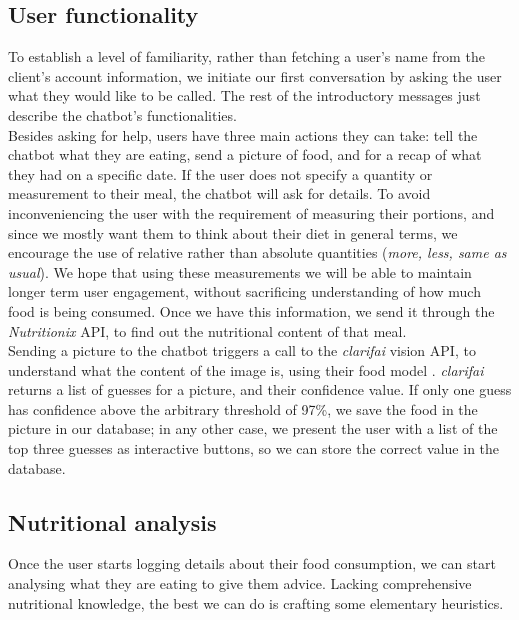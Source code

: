 \subsection{User functionality}
To establish a level of familiarity, rather than fetching a user's name from the client's account information, we initiate our first conversation by asking the user what they would like to be called. The rest of the introductory messages just describe the chatbot's functionalities.\\
Besides asking for help, users have three main actions they can take: tell the chatbot what they are eating, send a picture of food, and for a recap of what they had on a specific date. If the user does not specify a quantity or measurement to their meal, the chatbot will ask for details. To avoid inconveniencing the user with the requirement of measuring their portions, and since we mostly want them to think about their diet in general terms, we encourage the use of relative rather than absolute quantities (\textit{more, less, same as usual}). We hope that using these measurements we will be able to maintain longer term user engagement, without sacrificing understanding of how much food is being consumed. Once we have this information, we send it through the \textit{Nutritionix} API, to find out the nutritional content of that meal. \\
Sending a picture to the chatbot triggers a call to the \textit{clarifai} vision API, to understand what the content of the image is, using their food model \cite{clarifaifood}. \textit{clarifai} returns a list of guesses for a picture, and their confidence value. If only one guess has confidence above the arbitrary threshold of 97\%, we save the food in the picture in our database; in any other case, we present the user with a list of the top three guesses as interactive buttons, so we can store the correct value in the database. 
\subsection{Nutritional analysis}
Once the user starts logging details about their food consumption, we can start analysing what they are eating to give them advice. Lacking comprehensive nutritional knowledge, the best we can do is crafting some elementary heuristics. 

